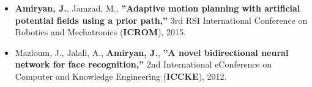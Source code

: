 \documentclass[10pt]{res}
\begin{document}
\begin{resume}
\begin{itemize}[leftmargin=*, itemsep=2pt]

\item {\bf Amiryan, J.}, Jamzad, M., {\bf ''Adaptive motion planning with artificial potential fields using a prior path,''} 3rd RSI International Conference on Robotics and Mechatronics (\textbf{ICROM}), 2015.


\item Mazloum, J., Jalali, A., {\bf Amiryan, J.}, {\bf ''A novel bidirectional neural network for face recognition,''} 2nd International eConference on Computer and Knowledge Engineering (\textbf{ICCKE}), 2012.

\end{itemize}



\end{resume}
\end{document}
